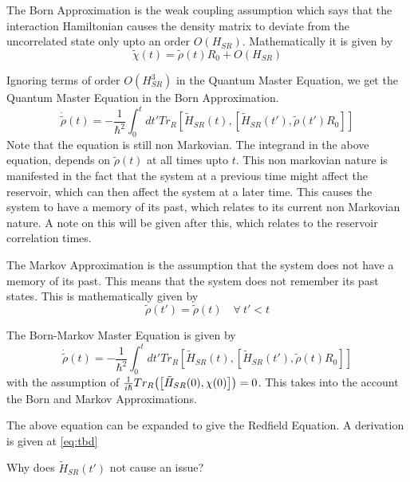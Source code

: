 \documentclass{scrartcl}
\newcommand{\1}{\mathbbm{1}}
\newcommand{\ihsr}{\tilde{H}_{SR}}
\begin{document}
\begin{definition}
    The Born Approximation is the weak coupling assumption which says that the interaction Hamiltonian
    causes the density matrix to deviate from the uncorrelated state only upto an order $O(H_{SR})$.
    Mathematically it is given by 
    \begin{equation}
        \tilde{\chi}(t) = \tilde{\rho}(t) R_0  + O(H_{SR})  
    \end{equation}
\end{definition}
Ignoring terms of order $O(H_{SR}^3)$ in the Quantum Master Equation, we get the Quantum Master Equation in the Born Approximation.
\begin{equation}
    \dot{\tilde{\rho}}(t) = -\frac{1}{\hbar^2} \int_0^t dt' Tr_R[\tilde{H}_{SR}(t), [\tilde{H}_{SR}(t'), \tilde{\rho}(t')R_0]]
\end{equation}
Note that the equation is still non Markovian. The integrand in the above equation, depends on $\tilde{\rho}(t)$ at all times upto $t$.
This non markovian nature is manifested in the fact that the system at a previous time might affect the reservoir, which
can then affect the system at a later time. This causes the system to have a memory of its past, which relates to its current non Markovian nature. 
A note on this will be given after this, which relates to the reservoir correlation times.
\begin{definition}
    The Markov Approximation is the assumption that the system does not have a memory of its past. This means that the system
    does not remember its past states. This is mathematically given by 
    \begin{equation}
        \tilde{\rho}(t') = \tilde{\rho}(t) \quad \forall ~ t' < t
    \end{equation}
    
\end{definition}
\begin{definition}
    The Born-Markov Master Equation is given by 
    \begin{equation}
        \dot{\tilde{\rho}}(t) = -\frac{1}{\hbar^2} \int_0^t dt' Tr_R[\tilde{H}_{SR}(t), [\tilde{H}_{SR}(t'), \tilde{\rho}(t)R_0]]
    \end{equation}
    with the assumption of $\frac{1}{i\hbar} Tr_R\qty(\qty[\tilde{H}_{SR}(0),\chi (0)]) = 0$. This takes into the account the 
    Born and Markov Approximations.
\end{definition}
The above equation can be expanded to give the Redfield Equation. A derivation is given at \cref{eq:tbd}
\begin{remark}
    Why does $\ihsr (t')$ not cause an issue?
\end{remark}
\end{document}
